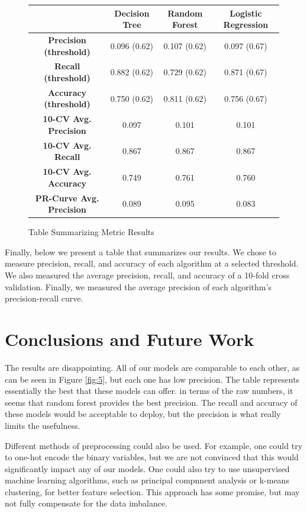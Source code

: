 \documentclass{article}
\begin{document}
\begin{figure}[h!]
\begin{tabular}{|c|c|c|c|}
\hline 
 & \textbf{Decision Tree} & \textbf{Random Forest} & \textbf{Logistic Regression} \\ 
\hline 
\textbf{Precision (threshold)} & 0.096 (0.62) & 0.107 (0.62)& 0.097 (0.67) \\ 
\hline 
\textbf{Recall (threshold)} & 0.882 (0.62) & 0.729 (0.62)&  0.871 (0.67)\\ 
\hline 
\textbf{Accuracy (threshold)} & 0.750 (0.62) & 0.811 (0.62) & 0.756 (0.67) \\ 
\hline 
\textbf{10-CV Avg. Precision} & 0.097 & 0.101 & 0.101 \\ 
\hline 
\textbf{10-CV Avg. Recall} & 0.867 & 0.867 & 0.867 \\ 
\hline 
\textbf{10-CV Avg. Accuracy} & 0.749 & 0.761 & 0.760 \\ 
\hline 
\textbf{PR-Curve Avg. Precision} & 0.089  & 0.095 & 0.083 \\ 
\hline 
\end{tabular} 

\caption{Table Summarizing Metric Results }
\label{fig:6}
\end{figure}

\newpage
Finally, below we present a table that summarizes our results. We chose to measure precision, recall, and accuracy of each algorithm at a selected threshold. We also measured the average precision, recall, and accuracy of a 10-fold cross validation. Finally, we measured the average precision of each algorithm's precision-recall curve. 
\newpage


\section{Conclusions and Future Work}
The results are disappointing. All of our models are comparable to each other, as can be seen in Figure \ref{fig:5}, but each one has low precision. The table represents essentially the best that these models can offer. in terms of the raw numbers, it seems that random forest provides the best precision. The recall and accuracy of these models would be acceptable to deploy, but the precision is what really limits the usefulness. 

Different methods of preprocessing could also be used. For example, one could try to one-hot encode the binary variables, but we are not convinced that this would significantly impact any of our models. One could also try to use unsupervised machine learning algorithms, such as principal compnnent analysis or k-means clustering, for better feature selection. This approach has some promise, but may not fully compensate for the data imbalance.          
\end{document}
